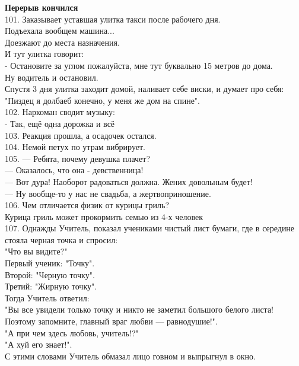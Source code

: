 \documentclass[a4paper,20pt,notitlepage]{extbook}
\begin{document}
	{\bf \Large Перерыв кончился}\\
	
	101. Заказывает уставшая улитка такси после рабочего дня.\\
	Подъехала вообщем машина...\\
	Доезжают до места назначения.\\
	И тут улитка говорит:\\
	- Остановите за углом пожалуйста, мне тут буквально 15 метров до дома.\\
	Ну водитель и остановил.\\
	Спустя 3 дня улитка заходит домой, наливает себе виски, и думает про себя: \\
	"Пиздец я долбаеб конечно, у меня же дом на спине".\\
	
	102. Наркоман сводит музыку:\\
	- Так, ещё одна дорожка и всё\\
	
	103. Реакция прошла, а осадочек остался.\\
	
	104. Немой петух по утрам вибрирует.\\
	
	105. — Ребята, почему девушка плачет?\\
	— Оказалось, что она - девственница!\\
	— Вот дура! Наоборот радоваться должна. Жених довольным будет!\\
	— Ну вообще-то у нас не свадьба, а жертвоприношение.\\
	
	106. Чем отличается физик от курицы гриль?\\
	Курица гриль может прокормить семью из 4-х человек\\
	
	107. Однажды Учитель, показал учениками чистый лист бумаги, где в середине стояла черная точка и спросил: \\
	"Что вы видите?"\\
	Первый ученик: "Точку".\\
	Второй: "Черную точку".\\
	Третий: "Жирную точку".\\
	Тогда Учитель ответил: \\
	"Вы все увидели только точку и никто не заметил большого белого листа! Поэтому запомните, главный враг любви — равнодушие!".\\
	"А при чем здесь любовь, учитель!?"\\
	"А хуй его знает!".\\
	 С этими словами Учитель обмазал лицо говном и выпрыгнул в окно.\\
	 
\end{document}
